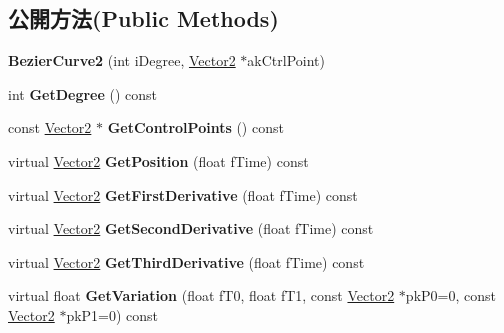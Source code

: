 \subsection*{公開方法(Public Methods)}
\begin{DoxyCompactItemize}
\item 
{\bfseries Bezier\+Curve2} (int i\+Degree, \hyperlink{class_magnum_1_1_vector2}{Vector2} $\ast$ak\+Ctrl\+Point)\hypertarget{class_magnum_1_1_bezier_curve2_a5dfa20b632800f51a56f0a4dbe74a2e8}{}\label{class_magnum_1_1_bezier_curve2_a5dfa20b632800f51a56f0a4dbe74a2e8}

\item 
int {\bfseries Get\+Degree} () const \hypertarget{class_magnum_1_1_bezier_curve2_aa0e528be06efb4535f70262cb9a5d32f}{}\label{class_magnum_1_1_bezier_curve2_aa0e528be06efb4535f70262cb9a5d32f}

\item 
const \hyperlink{class_magnum_1_1_vector2}{Vector2} $\ast$ {\bfseries Get\+Control\+Points} () const \hypertarget{class_magnum_1_1_bezier_curve2_abdb7a92902dae9730544f47654858f28}{}\label{class_magnum_1_1_bezier_curve2_abdb7a92902dae9730544f47654858f28}

\item 
virtual \hyperlink{class_magnum_1_1_vector2}{Vector2} {\bfseries Get\+Position} (float f\+Time) const \hypertarget{class_magnum_1_1_bezier_curve2_a80bc621305573898acd62a8369cd5d0d}{}\label{class_magnum_1_1_bezier_curve2_a80bc621305573898acd62a8369cd5d0d}

\item 
virtual \hyperlink{class_magnum_1_1_vector2}{Vector2} {\bfseries Get\+First\+Derivative} (float f\+Time) const \hypertarget{class_magnum_1_1_bezier_curve2_aaf5edce0cd0c3fc2f6fdae1673f3ba79}{}\label{class_magnum_1_1_bezier_curve2_aaf5edce0cd0c3fc2f6fdae1673f3ba79}

\item 
virtual \hyperlink{class_magnum_1_1_vector2}{Vector2} {\bfseries Get\+Second\+Derivative} (float f\+Time) const \hypertarget{class_magnum_1_1_bezier_curve2_ad10117e099d6d355269eb975cffb5ab1}{}\label{class_magnum_1_1_bezier_curve2_ad10117e099d6d355269eb975cffb5ab1}

\item 
virtual \hyperlink{class_magnum_1_1_vector2}{Vector2} {\bfseries Get\+Third\+Derivative} (float f\+Time) const \hypertarget{class_magnum_1_1_bezier_curve2_a151bf24236b47722b078e293984e2934}{}\label{class_magnum_1_1_bezier_curve2_a151bf24236b47722b078e293984e2934}

\item 
virtual float {\bfseries Get\+Variation} (float f\+T0, float f\+T1, const \hyperlink{class_magnum_1_1_vector2}{Vector2} $\ast$pk\+P0=0, const \hyperlink{class_magnum_1_1_vector2}{Vector2} $\ast$pk\+P1=0) const \hypertarget{class_magnum_1_1_bezier_curve2_a8851a4f1c8e647897097901e88040011}{}\label{class_magnum_1_1_bezier_curve2_a8851a4f1c8e647897097901e88040011}

\end{DoxyCompactItemize}
